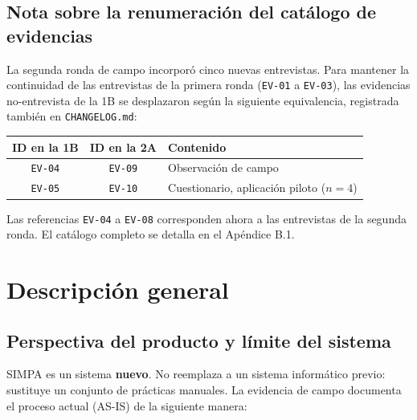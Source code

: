 \documentclass[11pt,a4paper]{article}
\newcommand{\id}[1]{\texttt{\begingroup\hyphenpenalty=10000\relax#1\endgroup}}
\renewcommand{\id}[1]{\texttt{#1}}
\begin{document}
\subsection{Nota sobre la renumeración del catálogo de evidencias}

La segunda ronda de campo incorporó cinco nuevas entrevistas. Para mantener la continuidad de las
entrevistas de la primera ronda (\id{EV-01} a \id{EV-03}), las evidencias no-entrevista de la 1B se
desplazaron según la siguiente equivalencia, registrada también en \id{CHANGELOG.md}:

\begin{center}
\begin{tabular}{|c|c|l|}
\hline
\rowcolor{grisclaro}\textbf{ID en la 1B} & \textbf{ID en la 2A} & \textbf{Contenido} \\ \hline
\id{EV-04} & \id{EV-09} & Observación de campo \\ \hline
\id{EV-05} & \id{EV-10} & Cuestionario, aplicación piloto ($n=4$) \\ \hline
\end{tabular}
\end{center}

\vspace{0.3cm}
\noindent Las referencias \id{EV-04} a \id{EV-08} corresponden ahora a las entrevistas de la segunda
ronda. El catálogo completo se detalla en el Apéndice B.1.

\newpage
\section{Descripción general}

\subsection{Perspectiva del producto y límite del sistema}

SIMPA es un sistema \textbf{nuevo}. No reemplaza a un sistema informático previo: sustituye un
conjunto de prácticas manuales. La evidencia de campo documenta el proceso actual (AS-IS) de la
siguiente manera:
\end{document}
